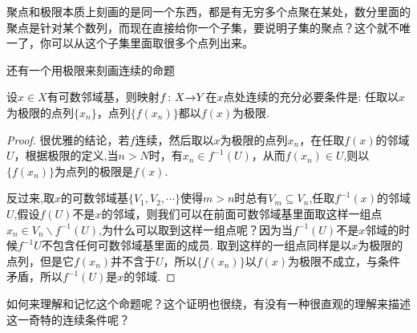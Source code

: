 聚点和极限本质上刻画的是同一个东西，都是有无穷多个点聚在某处，数分里面的聚点是针对某个数列，而现在直接给你一个子集，要说明子集的聚点？这个就不唯一了，你可以从这个子集里面取很多个点列出来。



还有一个用极限来刻画连续的命题

\begin{proposition}
设$x \in X$有可数邻域基，则映射${f}\colon{X}{\to}{Y}$在$x$点处连续的充分必要条件是: 任取以$x$为极限的点列$\{x_n\}$，点列$\{f(x_n)\}$都以$f(x)$为极限.
\end{proposition}

\begin{proof}
很优雅的结论，若$f$连续，然后取以$x$为极限的点列$x_n$，在任取$f(x)$的邻域$U$，根据极限的定义,当$n > N$时，有$x_n \in f^{-1}(U)$，从而$f(x_n) \in U$,则以$\{f(x_n)\}$为点列的极限是$f(x)$.

反过来,取$x$的可数邻域基$\{V_1,V_2,\cdots\}$使得$m > n$时总有$V_m \subseteq V_n$,任取$f^{-1}(x)$的邻域$U$,假设$f(U)$不是$x$的邻域，则我们可以在前面可数邻域基里面取这样一组点$x_n \in V_n \smallsetminus f^{-1}(U)$,为什么可以取到这样一组点呢？因为当$f^{-1}(U)$不是$x$邻域的时候$f^{-1}{U}$不包含任何可数邻域基里面的成员. 取到这样的一组点同样是以$x$为极限的点列，但是它$f(x_n)$并不含于$U$，所以$\{f(x_n)\}$以$f(x)$为极限不成立，与条件矛盾，所以$f^{-1}(U)$是$x$的邻域.
\end{proof}

如何来理解和记忆这个命题呢？这个证明也很绕，有没有一种很直观的理解来描述这一奇特的连续条件呢？

\begin{center}
\end{center}

